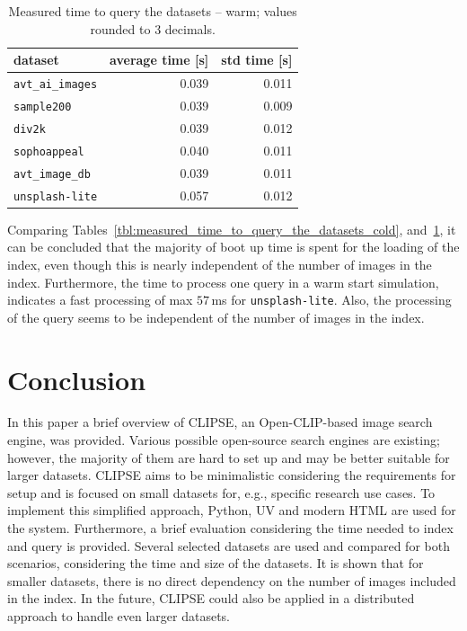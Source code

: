 \documentclass{article}
\begin{document}
\begin{table}[htb!]
\centering
\caption{Measured time to query the datasets -- warm; values rounded to 3 decimals.}
\label{tbl:measured_time_to_query_the_datasets_warm}
\begin{tabular}{lrr}
\toprule
dataset                  & average time [s] & std time [s]  \\
\midrule
\texttt{avt\_ai\_images} & 0.039            & 0.011 \\
\texttt{sample200}       & 0.039            & 0.009 \\
\texttt{div2k}           & 0.039            & 0.012 \\
\texttt{sophoappeal}     & 0.040            & 0.011 \\
\texttt{avt\_image\_db}  & 0.039            & 0.011 \\
\texttt{unsplash-lite}   & 0.057            & 0.012 \\
\bottomrule
\end{tabular}
\end{table}


Comparing Tables~\ref{tbl:measured_time_to_query_the_datasets_cold}, and~\ref{tbl:measured_time_to_query_the_datasets_warm}, it can be concluded that the majority of boot up time is spent for the loading of the index, even though this is nearly independent of the number of images in the index.
Furthermore, the time to process one query in a warm start simulation, indicates a fast processing of max $57$\,ms for \texttt{unsplash-lite}.
Also, the processing of the query seems to be independent of the number of images in the index.


\section{Conclusion}
In this paper a brief overview of CLIPSE, an Open-CLIP-based image search engine, was provided.
Various possible open-source search engines are existing; however, the majority of them are hard to set up and may be better suitable for larger datasets.
CLIPSE aims to be minimalistic considering the requirements for setup and is focused on small datasets for, e.g., specific research use cases.
To implement this simplified approach, Python, UV and modern HTML are used for the system.
Furthermore, a brief evaluation considering the time needed to index and query is provided.
Several selected datasets are used and compared for both scenarios, considering the time and size of the datasets.
It is shown that for smaller datasets, there is no direct dependency on the number of images included in the index.
In the future, CLIPSE could also be applied in a distributed approach to handle even larger datasets.



\end{document}
